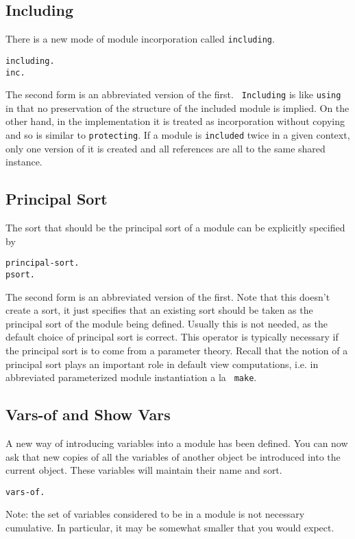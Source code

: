 \subsection{Including}
There is a new mode of module incorporation called {\tt including}.
\begin{alltt}
        including  .
        inc  .
\end{alltt}
The second form is an abbreviated version of the first.  {\tt
  Including} is like {\tt using} in that no preservation of the
structure of the included module is implied.  On the other hand, in
the implementation it is treated as incorporation without copying and
so is similar to {\tt protecting}.  If a module is {\tt included}
twice in a given context, only one version of it is created and all
references are all to the same shared instance.

\subsection{Principal Sort}
The sort that should be the principal sort of a module can be
explicitly specified by
\begin{alltt}
        principal-sort  .
        psort  .
\end{alltt}
The second form is an abbreviated version of the first.  Note that
this doesn't create a sort, it just specifies that an existing sort
should be taken as the principal sort of the module being defined.
Usually this is not needed, as the default choice of principal sort is
correct.  This operator is typically necessary if the principal sort
is to come from a parameter theory.  Recall that the notion of a
principal sort plays an important role in default view computations,
i.e. in abbreviated parameterized module instantiation a la {\tt
  make}.

\subsection{Vars-of and Show Vars}
A new way of introducing variables into a module has been defined.
You can now ask that new copies of all the variables of another object
be introduced into the current object.  These variables will maintain
their name and sort.
\begin{alltt}
        vars-of \lopt {} \ropt .
\end{alltt}
\noi Note: the set of variables considered to be in a module is not
necessary cumulative.  In particular, it may be somewhat smaller that
you would expect.

